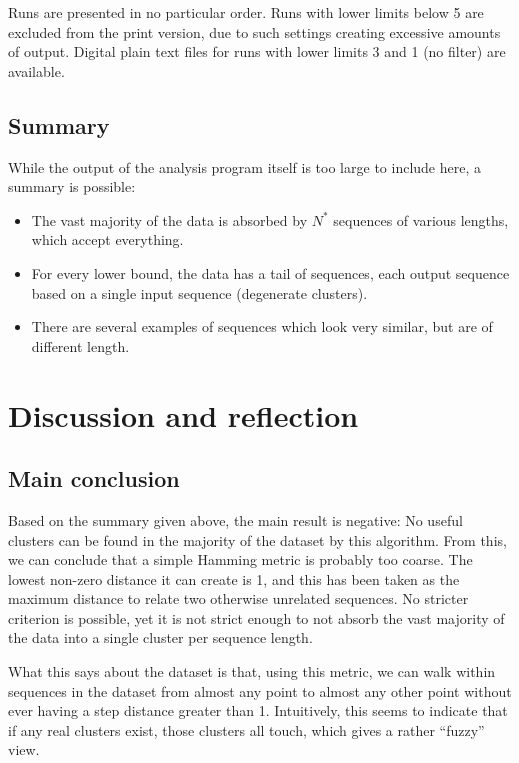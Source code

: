 \documentclass[fleqn]{book}
\providecommand{\tightlist}{%
  \setlength{\itemsep}{0pt}\setlength{\parskip}{0pt}}
\begin{document}
Runs are presented in no particular order. Runs with lower limits below
5 are excluded from the print version, due to such settings creating
excessive amounts of output. Digital plain text files for runs with
lower limits 3 and 1 (no filter) are available.

\section{Summary}\label{summary}

While the output of the analysis program itself is too large to include
here, a summary is possible:

\begin{itemize}
\tightlist
\item
  The vast majority of the data is absorbed by \(N^*\) sequences of
  various lengths, which accept everything.
\item
  For every lower bound, the data has a tail of sequences, each output
  sequence based on a single input sequence (degenerate clusters).
\item
  There are several examples of sequences which look very similar, but
  are of different length.
\end{itemize}

\chapter{Discussion and reflection}\label{discussion-and-reflection}

\section{Main conclusion}\label{main-conclusion}

Based on the summary given above, the main result is negative: No useful
clusters can be found in the majority of the dataset by this algorithm.
From this, we can conclude that a simple Hamming metric is probably too
coarse. The lowest non-zero distance it can create is 1, and this has
been taken as the maximum distance to relate two otherwise unrelated
sequences. No stricter criterion is possible, yet it is not strict
enough to not absorb the vast majority of the data into a single cluster
per sequence length.

What this says about the dataset is that, using this metric, we can walk
within sequences in the dataset from almost any point to almost any
other point without ever having a step distance greater than 1.
Intuitively, this seems to indicate that if any real clusters exist,
those clusters all touch, which gives a rather ``fuzzy'' view.
\end{document}
